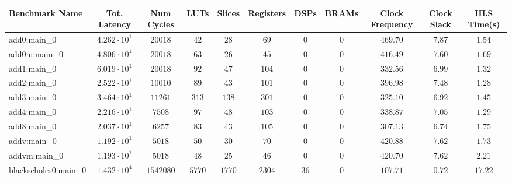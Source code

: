 \begin{tabular}{|l|c|c|c|c|c|c|c|c|c|c|}
\hline
Benchmark Name                 & Tot. Latency           & Num Cycles   & LUTs       & Slices     & Registers  & DSPs     & BRAMs    & Clock Frequency & Clock Slack & HLS Time(s) \\
\hline
add0:main\_0                   & $ 4.262 \cdot 10^{1} $ & $ 20018    $ & $ 42     $ & $ 28     $ & $ 69     $ & $ 0    $ & $ 0    $ & $ 469.70      $ & $ 7.87    $ & $ 1.54    $ \\
add0m:main\_0                  & $ 4.806 \cdot 10^{1} $ & $ 20018    $ & $ 63     $ & $ 26     $ & $ 45     $ & $ 0    $ & $ 0    $ & $ 416.49      $ & $ 7.60    $ & $ 1.69    $ \\
add1:main\_0                   & $ 6.019 \cdot 10^{1} $ & $ 20018    $ & $ 92     $ & $ 47     $ & $ 104    $ & $ 0    $ & $ 0    $ & $ 332.56      $ & $ 6.99    $ & $ 1.32    $ \\
add2:main\_0                   & $ 2.522 \cdot 10^{1} $ & $ 10010    $ & $ 89     $ & $ 43     $ & $ 101    $ & $ 0    $ & $ 0    $ & $ 396.98      $ & $ 7.48    $ & $ 1.28    $ \\
add3:main\_0                   & $ 3.464 \cdot 10^{1} $ & $ 11261    $ & $ 313    $ & $ 138    $ & $ 301    $ & $ 0    $ & $ 0    $ & $ 325.10      $ & $ 6.92    $ & $ 1.45    $ \\
add4:main\_0                   & $ 2.216 \cdot 10^{1} $ & $ 7508     $ & $ 97     $ & $ 48     $ & $ 103    $ & $ 0    $ & $ 0    $ & $ 338.87      $ & $ 7.05    $ & $ 1.29    $ \\
add8:main\_0                   & $ 2.037 \cdot 10^{1} $ & $ 6257     $ & $ 83     $ & $ 43     $ & $ 105    $ & $ 0    $ & $ 0    $ & $ 307.13      $ & $ 6.74    $ & $ 1.75    $ \\
addv:main\_0                   & $ 1.192 \cdot 10^{1} $ & $ 5018     $ & $ 50     $ & $ 30     $ & $ 70     $ & $ 0    $ & $ 0    $ & $ 420.88      $ & $ 7.62    $ & $ 1.73    $ \\
addvm:main\_0                  & $ 1.193 \cdot 10^{1} $ & $ 5018     $ & $ 48     $ & $ 25     $ & $ 46     $ & $ 0    $ & $ 0    $ & $ 420.70      $ & $ 7.62    $ & $ 2.21    $ \\
blackscholes0:main\_0          & $ 1.432 \cdot 10^{4} $ & $ 1542080  $ & $ 5770   $ & $ 1770   $ & $ 2304   $ & $ 36   $ & $ 0    $ & $ 107.71      $ & $ 0.72    $ & $ 17.22   $ \\

\end{tabular}
